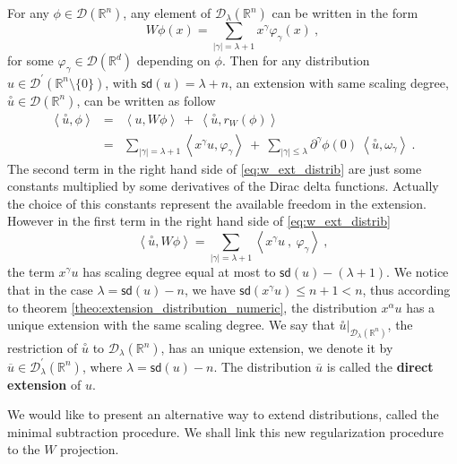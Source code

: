 \documentclass[11pt]{book}
\newcommand{\sd}{\mathsf{sd}}
\newcommand{\abs}[1]{\left|#1\right|}
\newcommand{\sm}[1]{\left\langle#1\right\rangle}
\newcommand{\exte}[1]{\overset{\circ}{#1}}
\newcommand{\Dcal}{\mathcal{D}}
\newcommand{\Rbb}{\mathbb{R}}
\theoremstyle{break}
\begin{document}
For any $\phi \in \Dcal(\Rbb^n)$, any element of $\Dcal_\lambda(\Rbb^n)$ can be written in the form
%
\begin{equation*}
W \phi(x) = \sum_{\abs{\gamma}=\lambda+1} x^\gamma \varphi_\gamma(x) \ ,
\end{equation*}
%
for some $\varphi_\gamma \in \Dcal(\Rbb^d)$ depending on $\phi$. Then for any distribution $u\in\Dcal^\prime(\Rbb^n\setminus\{0\})$, with $\sd(u) = \lambda +n$, an extension with same scaling degree, $\exte{u} \in \Dcal(\Rbb^n)$, can be written as follow
% 
\begin{eqnarray}
\sm{\exte{u},\phi} &=& \sm{u,W\phi} \ + \ \sm{\exte{u},r_W(\phi)} \nonumber \\
&=& \sum_{\abs{\gamma}=\lambda+1} \sm{x^\gamma u , \varphi_\gamma} \ + \ \sum_{\abs{\gamma}\leq\lambda} \partial^\gamma \phi(0) \ \sm{\exte{u},\omega_\gamma} \ .
\label{eq:w_ext_distrib}
\end{eqnarray}
%
The second term in the right hand side of \eqref{eq:w_ext_distrib} are just some constants multiplied by some derivatives of the Dirac delta functions. Actually the choice of this constants represent the available freedom in the extension. However in the first term in the right hand side of \eqref{eq:w_ext_distrib} 
% 
\begin{equation*}
\sm{\exte{u},W\phi} = \sum_{\abs{\gamma}=\lambda+1} \sm{x^\gamma u \ , \ \varphi_\gamma} \ ,
\end{equation*}
%
the term $x^\gamma u$ has scaling degree equal at most to $\sd(u) - (\lambda+1)$. We notice that in the case $\lambda = \sd(u) - n$, we have $\sd(x^\gamma u)\leq n+1 < n$, thus according to theorem \ref{theo:extension_distribution_numeric}, the distribution $x^\alpha u$ has a unique extension with the same scaling degree. We say that $\exte{u}|_{\Dcal_\lambda(\Rbb^n)}$, the restriction of $\exte{u}$ to $\Dcal_\lambda(\Rbb^n)$, has an unique extension, we denote it by $\overline{u} \in \Dcal^\prime_\lambda(\Rbb^n)$, where $\lambda = \sd(u) - n$. The distribution $\overline{u}$ is called the \textbf{direct extension} of $u$.


\bigskip


We would like to present an alternative way to extend distributions, called the minimal subtraction procedure. We shall link this new regularization procedure to the $W$ projection.
\end{document}
